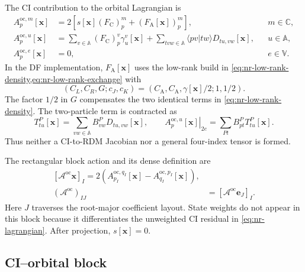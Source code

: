 \documentclass[aip,preprint,nofootinbib]{revtex4-1}
\newcommand{\core}{\mathrm{C}}
\newcommand{\act}{\mathrm{A}}
\begin{document}
The CI contribution to the orbital Lagrangian is
\begin{align}
 A^{\mathrm{oc},m}_{p}[\mathbf x]
 &=2\left[s[\mathbf x](F_{\core})^m_p
         +(F_{\act}[\mathbf x])^m_p\right],
 &&m\in\mathbb C,
 \label{eq:nr-oc-lagrangian-core}
 \\
 A^{\mathrm{oc},u}_{p}[\mathbf x]
 &=\sum_{v\in\mathbb A}(F_{\core})^v_p\gamma^v_u[\mathbf x]
 +\sum_{tvw\in\mathbb A}\langle pv|tw\rangle
   D_{tu,vw}[\mathbf x],
 &&u\in\mathbb A,
 \label{eq:nr-oc-lagrangian-active}
 \\
 A^{\mathrm{oc},e}_{p}[\mathbf x]&=0,
 &&e\in\mathbb V.
\end{align}
In the DF implementation, $F_{\act}[\mathbf x]$ uses the low-rank build in
\cref{eq:nr-low-rank-density,eq:nr-low-rank-exchange} with
\begin{equation}
 (C_L,C_R,G;c_J,c_K)
 =(C_{\act},C_{\act},\gamma[\mathbf x]/2;1,1/2).
\end{equation}
The factor $1/2$ in $G$ compensates the two identical terms in
\cref{eq:nr-low-rank-density}.  The two-particle term is contracted as
\begin{equation}
 T^P_{tu}[\mathbf x]
 =\sum_{vw\in\mathbb A}B^P_{vw}D_{tu,vw}[\mathbf x],
 \qquad
 \left.A^{\mathrm{oc},u}_{p}[\mathbf x]\right|_{2e}
 =\sum_{Pt}B^P_{pt}T^P_{tu}[\mathbf x].
 \label{eq:nr-df-oc}
\end{equation}
Thus neither a CI-to-RDM Jacobian nor a general four-index tensor is formed.

The rectangular block action and its dense definition are
\begin{align}
 \boxed{
 [\mathcal A^{\mathrm{oc}}\mathbf x]_I
 =2\left(A^{\mathrm{oc},q_I}_{p_I}[\mathbf x]
         -A^{\mathrm{oc},p_I}_{q_I}[\mathbf x]\right)
 },
 \label{eq:nr-oc-action}
 \\
 (\mathcal A^{\mathrm{oc}})_{IJ}
 &=[\mathcal A^{\mathrm{oc}}\mathbf e_J]_I.
\end{align}
Here $J$ traverses the root-major coefficient layout.  State weights do not
appear in this block because it differentiates the unweighted CI residual in
\cref{eq:nr-lagrangian}.  After projection, $s[\mathbf x]=0$.

\subsection{CI--orbital block}
\end{document}
